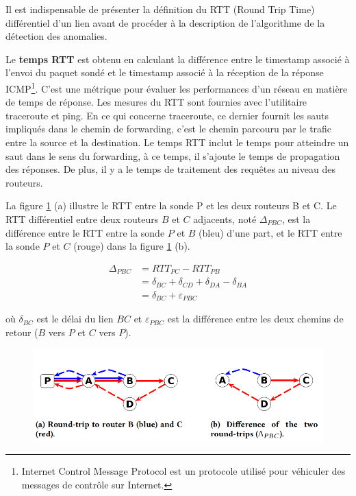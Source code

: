 Il est indispensable de présenter la définition du RTT  (Round Trip Time)  différentiel d'un lien avant de procéder à la description de l'algorithme de la détection des anomalies. 


\begin{tcolorbox}
	
	Le \textbf{temps RTT} est obtenu en calculant la différence entre le timestamp associé à l'envoi du paquet sondé  et le timestamp associé à la réception de la réponse ICMP\footnote{Internet Control Message Protocol est un protocole utilisé pour véhiculer des messages de contrôle sur Internet.}. C'est une métrique pour évaluer les performances d'un réseau en matière de temps de réponse. Les mesures du RTT sont fournies avec l'utilitaire traceroute et ping. En ce qui concerne traceroute,  ce dernier fournit les sauts impliqués dans le  chemin de forwarding, c'est le chemin parcouru par le trafic entre la source et la destination. Le temps RTT inclut le temps pour atteindre un saut dans le sens du forwarding, à ce temps, il s'ajoute le temps de propagation des réponses. De plus, il y a  le temps de traitement des requêtes au niveau des routeurs. 
\end{tcolorbox}

La figure 	\ref{fig:rtt-differ} (a)  illustre le RTT entre la sonde P et les deux routeurs B et C. Le RTT différentiel  entre deux routeurs $B$ et $C$ adjacents, noté $\Delta_{PBC}$, est la différence entre le RTT entre la sonde $P$ et $B$ (bleu) d'une part, et le RTT entre la sonde $P$ et $C$ (rouge) dans la figure 	\ref{fig:rtt-differ} (b). 

\begin{align*}
\Delta_{PBC} &= RTT_{PC} - RTT_{PB} \\
&= \delta_{BC} + \delta_{CD} + \delta_{DA}  - \delta_{BA} \\
&= \delta_{BC} + \varepsilon_{PBC}
\end{align*}

où $\delta_{BC}$ est le délai du lien $BC$ et $\varepsilon_{PBC}$ est la différence entre les deux chemins de retour ($B$ vers $P$ et $C$ vers $P$). 
\begin{figure}[H]
	\centering
	\includegraphics[width=0.7\linewidth]{illustrations/rtt-differ}
	\caption{}
	\label{fig:rtt-differ}
\end{figure}

